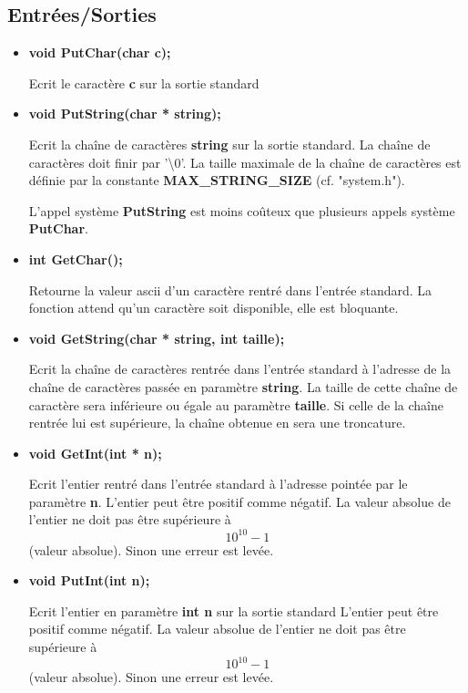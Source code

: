 \documentclass{article}
\begin{document}
\subsection{Entrées/Sorties}
\begin{itemize}
    \item 
    \textbf{void PutChar(char c);}
    
    Ecrit le caractère \textbf{c}  sur la sortie standard
    
    \item 
    \textbf{void PutString(char * string);}
    
    Ecrit la chaîne de caractères \textbf{string} sur la sortie standard.
    La chaîne de caractères doit finir par '\textbackslash0'.
    La taille maximale de la chaîne de caractères est définie par la constante \textbf{MAX\_STRING\_SIZE} (cf. "system.h").

    L'appel système \textbf{PutString} est moins coûteux que plusieurs appels système \textbf{PutChar}.
    
     \item 
    \textbf{int GetChar();}
    
    Retourne la valeur ascii d'un caractère rentré dans l'entrée standard.
    La fonction attend qu'un caractère soit disponible, elle est bloquante.
    
    
     \item 
    \textbf{void GetString(char * string, int taille);}
    
    Ecrit la chaîne de caractères rentrée dans l'entrée standard à l'adresse de la chaîne de caractères passée en paramètre \textbf{string}. La taille de cette chaîne de caractère sera inférieure ou égale au paramètre \textbf{taille}. Si celle de la chaîne rentrée lui est supérieure, la chaîne obtenue en sera une troncature.
    
      \item 
    \textbf{void GetInt(int * n);}
    
    Ecrit l'entier rentré dans l'entrée standard à l'adresse pointée par le paramètre \textbf{n}.
    L'entier peut être positif comme négatif.
    La valeur absolue de l'entier ne doit pas être supérieure à \[10^{10}-1\] (valeur absolue). Sinon une erreur est levée.
    
    
    
      \item 
    \textbf{void PutInt(int n);}
    
     Ecrit l'entier en paramètre \textbf{int n} sur la sortie standard
    L'entier peut être positif comme négatif.
    La valeur absolue de l'entier ne doit pas être supérieure à \[10^{10}-1\] (valeur absolue). Sinon une erreur est levée.
    
    
\end{itemize}
\end{document}
